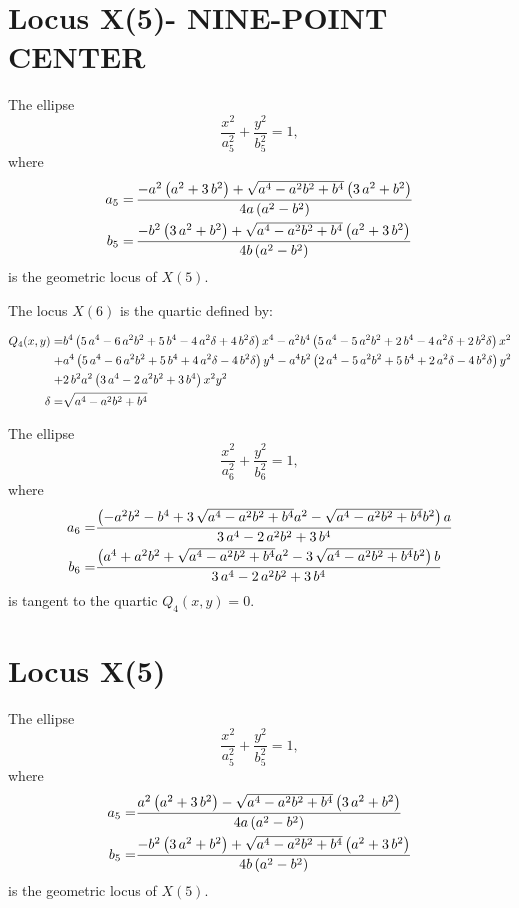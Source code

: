\documentclass[11pt]{amsart}
\theoremstyle{plain}
\theoremstyle{definition}
\begin{document}
   \section{Locus X(5)- NINE-POINT CENTER}
 
 The ellipse \[ \frac{x^2}{a_{5}^2}+\frac{y^2}{b_{5}^2}=1, \]
 where
 \[\aligned 
 a_5=&     \,{\frac {-{a}^{2} \left( {a}^{2}+3\,{b}^{2} \right) +\sqrt {{a}^{4
 			}-{a}^{2}{b}^{2}+{b}^{4}} \left( 3\,{a}^{2}+{b}^{2} \right) }{ 4a\left( 
 		{a}^{2}-{b}^{2} \right)  }}
 \\
 b_5=&   \,{\frac {-{b}^{2} \left( 3\,{a}^{2}+{b}^{2} \right) +\sqrt {{a}^{4
 			}-{a}^{2}{b}^{2}+{b}^{4}} \left( {a}^{2}+3\,{b}^{2} \right) }{4b
 		\left( {a}^{2}-{b}^{2} \right) }}
 
 \endaligned\] 
 is the geometric locus of $X(5)$.
 
 
 The locus $X(6)$ is the quartic defined by:
 
 
 \[\aligned Q_4(x,y)=&
 {b}^{4} \left( 5\,{a}^{4}-6\,{a}^{2}{b}^{2}+5\,{b}^{4}-4\,{a}^{2}
 \delta+4\,{b}^{2}\delta \right) {x}^{4}-{a}^{2}{b}^{4} \left( 5\,{a}^{
 	4}-5\,{a}^{2}{b}^{2}+2\,{b}^{4}-4\,{a}^{2}\delta+2\,{b}^{2}\delta
 \right) {x}^{2}\\
 +&{a}^{4} \left( 5\,{a}^{4}-6\,{a}^{2}{b}^{2}+5\,{b}^{4
 }+4\,{a}^{2}\delta-4\,{b}^{2}\delta \right) {y}^{4}-{a}^{4}{b}^{2}
 \left( 2\,{a}^{4}-5\,{a}^{2}{b}^{2}+5\,{b}^{4}+2\,{a}^{2}\delta-4\,{b
 }^{2}\delta \right) {y}^{2}\\
+&2\,{b}^{2}{a}^{2} \left( 3\,{a}^{4}-2\,{a}
 ^{2}{b}^{2}+3\,{b}^{4} \right) {x}^{2}{y}^{2}\\
 \delta=&\sqrt {{a}^{4}-{a}^{2}{b}^{2}+{b}^{4}}\endaligned
 \]
 
 
 The ellipse \[ \frac{x^2}{a_6^2}+\frac{y^2}{b_6^2}=1, \]
 where
\[\aligned  a_6=& {\frac { \left( -{a}^{2}{b}^{2}-{b}^{4}+3\,\sqrt {{a}^{4}-{a}^{2}{b}^{
  				2}+{b}^{4}}{a}^{2}-\sqrt {{a}^{4}-{a}^{2}{b}^{2}+{b}^{4}}{b}^{2}
  		\right) a}{3\,{a}^{4}-2\,{a}^{2}{b}^{2}+3\,{b}^{4}}}\\
  	b_6=&{\frac { \left( {a}^{4}+{a}^{2}{b}^{2}+\sqrt {{a}^{4}-{a}^{2}{b}^{2}+{
  					b}^{4}}{a}^{2}-3\,\sqrt {{a}^{4}-{a}^{2}{b}^{2}+{b}^{4}}{b}^{2}
  			\right) b}{3\,{a}^{4}-2\,{a}^{2}{b}^{2}+3\,{b}^{4}}}
  		\endaligned
   \]
   is tangent to the quartic $Q_4(x,y)=0.$
   
  \section{Locus X(5)}
   The ellipse \[ \frac{x^2}{a_{5}^2}+\frac{y^2}{b_{5}^2}=1, \]
  where
  \[\aligned 
  a_5=&   \frac {{a}^{2} \left( {a}^{2}+3\,{b}^{2} \right) -\sqrt {{a}^{4}
  		-{a}^{2}{b}^{2}+{b}^{4}} \left( 3\,{a}^{2}+{b}^{2} \right) }{4a \left( 
  	{a}^{2}-{b}^{2} \right) }
 \\
   	b_5=&{\frac {-{b}^{2} \left( 3\,{a}^{2}+{b}^{2} \right) +\sqrt {{a}^{4
   				}-{a}^{2}{b}^{2}+{b}^{4}} \left( {a}^{2}+3\,{b}^{2} \right) }{4b
   			\left( {a}^{2}-{b}^{2} \right) }}
   	\endaligned\] 
   is the geometric locus of $X(5)$.
     
\end{document}
